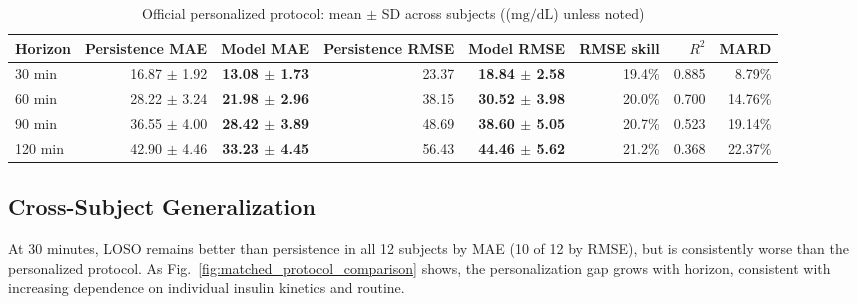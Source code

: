 \documentclass[journal]{IEEEtran}
\begin{document}
\begin{table}[t]
\centering
\caption{Official personalized protocol: mean $\pm$ SD across subjects (($\mathrm{mg/dL}$) unless noted)}
\label{tab:official}
\footnotesize
\begin{tabular}{lrrrrrrr}
\toprule
Horizon & Persistence MAE & Model MAE & Persistence RMSE & Model RMSE & RMSE skill & $R^2$ & MARD \\
\midrule
30 min & 16.87 $\pm$ 1.92 & \textbf{13.08 $\pm$ 1.73} & 23.37 & \textbf{18.84 $\pm$ 2.58} & 19.4\% & 0.885 & 8.79\% \\
60 min & 28.22 $\pm$ 3.24 & \textbf{21.98 $\pm$ 2.96} & 38.15 & \textbf{30.52 $\pm$ 3.98} & 20.0\% & 0.700 & 14.76\% \\
90 min & 36.55 $\pm$ 4.00 & \textbf{28.42 $\pm$ 3.89} & 48.69 & \textbf{38.60 $\pm$ 5.05} & 20.7\% & 0.523 & 19.14\% \\
120 min & 42.90 $\pm$ 4.46 & \textbf{33.23 $\pm$ 4.45} & 56.43 & \textbf{44.46 $\pm$ 5.62} & 21.2\% & 0.368 & 22.37\% \\
\bottomrule
\end{tabular}
\end{table}

\subsection{Cross-Subject Generalization}

At 30 minutes, LOSO remains better than persistence in all 12 subjects by MAE (10 of 12 by RMSE), but is consistently worse than the personalized protocol. As Fig.~\ref{fig:matched_protocol_comparison} shows, the personalization gap grows with horizon, consistent with increasing dependence on individual insulin kinetics and routine.

\losotable
{}\of\maetable \global\let\persA=\pgfplotsretval
{}\of\maetable \global\let\persB=\pgfplotsretval
{}\of\maetable \global\let\persC=\pgfplotsretval
{}\of\maetable \global\let\persD=\pgfplotsretval
{}\of\maetable \global\let\persoA=\pgfplotsretval
{}\of\maetable \global\let\persoB=\pgfplotsretval
{}\of\maetable \global\let\persoC=\pgfplotsretval
{}\of\maetable \global\let\persoD=\pgfplotsretval
{}\of\losotable \global\let\losoA=\pgfplotsretval
{}\of\losotable \global\let\losoB=\pgfplotsretval
{}\of\losotable \global\let\losoC=\pgfplotsretval
{}\of\losotable \global\let\losoD=\pgfplotsretval
\end{document}
